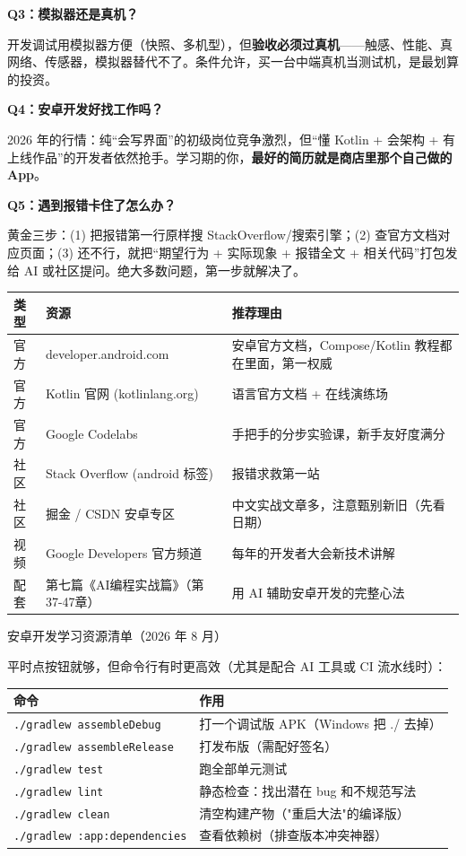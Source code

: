 \textbf{Q3：模拟器还是真机？}

开发调试用模拟器方便（快照、多机型），但\textbf{验收必须过真机}——触感、性能、真网络、传感器，模拟器替代不了。条件允许，买一台中端真机当测试机，是最划算的投资。

\textbf{Q4：安卓开发好找工作吗？}

2026 年的行情：纯“会写界面”的初级岗位竞争激烈，但“懂 Kotlin + 会架构 + 有上线作品”的开发者依然抢手。学习期的你，\textbf{最好的简历就是商店里那个自己做的 App}。

\textbf{Q5：遇到报错卡住了怎么办？}

黄金三步：(1) 把报错第一行原样搜 StackOverflow/搜索引擎；(2) 查官方文档对应页面；(3) 还不行，就把“期望行为 + 实际现象 + 报错全文 + 相关代码”打包发给 AI 或社区提问。绝大多数问题，第一步就解决了。


\begin{center}
\begin{tabularx}{\linewidth}{|X|X|X|}
\hline
\textbf{类型} & \textbf{资源} & \textbf{推荐理由} \tabularnewline
\hline
官方 & developer.android.com & 安卓官方文档，Compose/Kotlin 教程都在里面，第一权威 \tabularnewline
官方 & Kotlin 官网 (kotlinlang.org) & 语言官方文档 + 在线演练场 \tabularnewline
官方 & Google Codelabs & 手把手的分步实验课，新手友好度满分 \tabularnewline
社区 & Stack Overflow (android 标签) & 报错求救第一站 \tabularnewline
社区 & 掘金 / CSDN 安卓专区 & 中文实战文章多，注意甄别新旧（先看日期） \tabularnewline
视频 & Google Developers 官方频道 & 每年的开发者大会新技术讲解 \tabularnewline
配套 & 第七篇《AI编程实战篇》（第37-47章） & 用 AI 辅助安卓开发的完整心法 \tabularnewline
\hline
\end{tabularx}
\end{center}

\begin{center}\small\color{gray}安卓开发学习资源清单（2026 年 8 月）\end{center}


平时点按钮就够，但命令行有时更高效（尤其是配合 AI 工具或 CI 流水线时）：

\begin{center}
\begin{tabularx}{\linewidth}{|X|X|}
\hline
\textbf{命令} & \textbf{作用} \tabularnewline
\hline
\texttt{.\allowbreak /\allowbreak gradlew assembleDebug} & 打一个调试版 APK（Windows 把 ./ 去掉） \tabularnewline
\texttt{.\allowbreak /\allowbreak gradlew assembleRelease} & 打发布版（需配好签名） \tabularnewline
\texttt{.\allowbreak /\allowbreak gradlew test} & 跑全部单元测试 \tabularnewline
\texttt{.\allowbreak /\allowbreak gradlew lint} & 静态检查：找出潜在 bug 和不规范写法 \tabularnewline
\texttt{.\allowbreak /\allowbreak gradlew clean} & 清空构建产物（"重启大法"的编译版） \tabularnewline
\texttt{.\allowbreak /\allowbreak gradlew :app:dependencies} & 查看依赖树（排查版本冲突神器） \tabularnewline
\hline
\end{tabularx}
\end{center}

